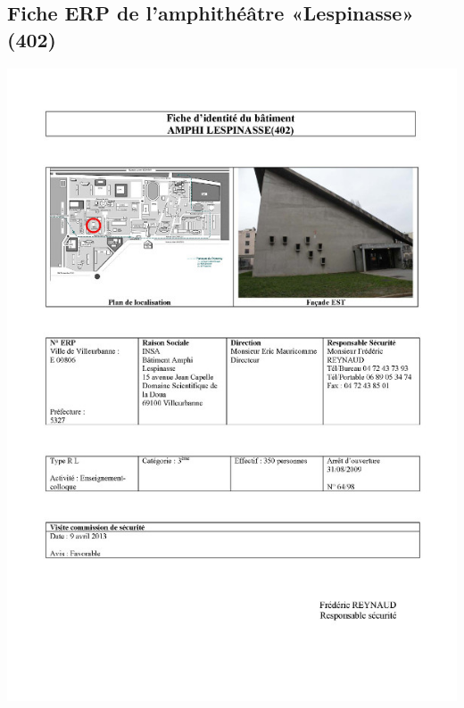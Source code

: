 \documentclass[hidelinks, paper=a4, fontsize=13pt]{report}
\begin{document}
\subsection{Fiche ERP de l’amphithéâtre «Lespinasse» (402)}
\begin{center}
\includegraphics[scale=0.72]{Annexes/Documents/ERPLespinasse}
\end{center}
\end{document}
